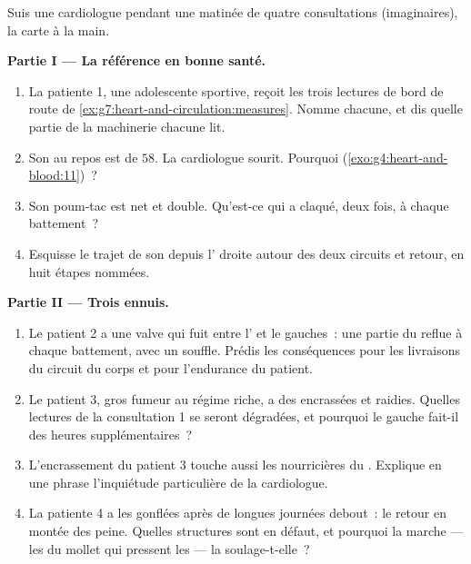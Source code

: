 \begin{problem}\label{pb:g7:heart-and-circulation:1}
Suis une cardiologue pendant une matinée de quatre consultations
(imaginaires), la carte à la main.

\medskip\noindent\textbf{Partie I --- La référence en bonne
santé.}
\begin{enumerate}
  \item La patiente 1, une adolescente sportive, reçoit les trois
        lectures de bord de route de
        \cref{ex:g7:heart-and-circulation:measures}. Nomme chacune,
        et dis quelle partie de la machinerie chacune lit.
  \item Son  au repos est de $58$. La cardiologue sourit.
        Pourquoi
        (\cref{exo:g4:heart-and-blood:11})~?
  \item Son poum-tac est net et double. Qu'est-ce qui a claqué,
        deux fois, à chaque battement~?
  \item Esquisse le trajet de son  depuis l' droite
        autour des deux circuits et retour, en huit étapes nommées.
\end{enumerate}

\medskip\noindent\textbf{Partie II --- Trois ennuis.}
\begin{enumerate}[resume]
  \item Le patient 2 a une valve qui fuit entre l' et le
         gauches~: une partie du  reflue à chaque
        battement, avec un souffle. Prédis les conséquences pour les
        livraisons du circuit du corps et pour l'endurance du
        patient.
  \item Le patient 3, gros fumeur au régime riche, a des 
        encrassées et raidies. Quelles lectures de la consultation 1
        se seront dégradées, et pourquoi le  gauche
        fait-il des heures supplémentaires~?
  \item L'encrassement du patient 3 touche aussi les 
        nourricières du . Explique en une phrase l'inquiétude
        particulière de la cardiologue.
  \item La patiente 4 a les  gonflées après de longues
        journées debout~: le retour en montée des  peine.
        Quelles structures sont en défaut, et pourquoi la marche ---
        les  du mollet qui pressent les  --- la
        soulage-t-elle~?
\end{enumerate}


\end{problem}
